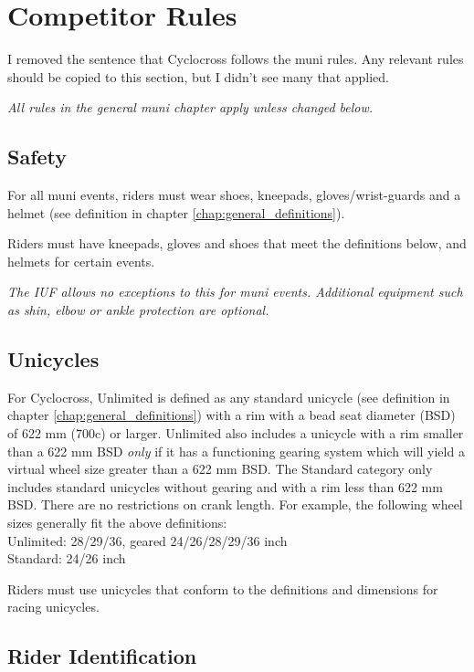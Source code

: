 \chapter{Competitor Rules}


\begin{framed}
I removed the sentence that Cyclocross follows the muni rules. Any relevant rules should be copied to this section, but I didn't see many that applied.
\end{framed}

\textit{All rules in the general muni chapter apply unless changed below.}

\section{Safety}
For all muni events, riders must wear shoes, kneepads, gloves/wrist-guards and a helmet (see definition in chapter \ref{chap:general_definitions}).

Riders must have kneepads, gloves and shoes that meet the definitions below, and helmets for certain events.

\textit{The IUF allows no exceptions to this for muni events. Additional equipment such as shin, elbow or ankle protection are optional.}

\section{Unicycles}

For Cyclocross, Unlimited is defined as any standard unicycle (see definition in chapter \ref{chap:general_definitions}) with a rim with a bead seat diameter (BSD) of 622 mm (700c) or larger.
Unlimited also includes a unicycle with a rim smaller than a 622 mm BSD {\em only} if it has a functioning gearing system which will yield a virtual wheel size greater than a 622 mm BSD.
The Standard category only includes standard unicycles without gearing and with a rim less than 622 mm BSD.
There are no restrictions on crank length.
For example, the following wheel sizes generally fit the above definitions: \\
Unlimited: 28/29/36, geared 24/26/28/29/36 inch \\
Standard: 24/26 inch

Riders must use unicycles that conform to the definitions and dimensions for racing unicycles.

\section{Rider Identification}

